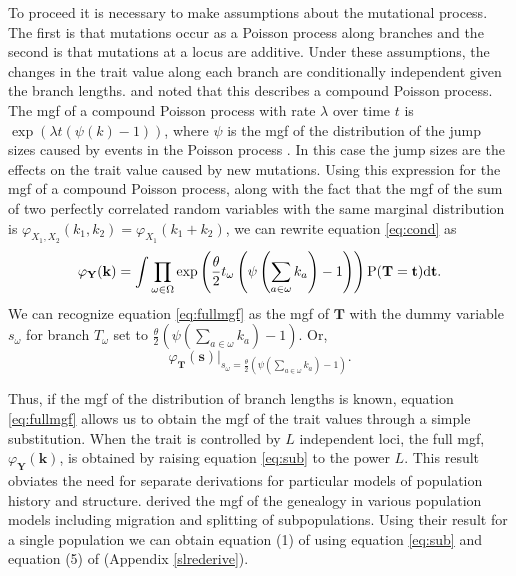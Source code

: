 To proceed it is necessary to make assumptions about the mutational process. The
first is that mutations occur as a Poisson process along branches and the second
is that mutations at a locus are additive. Under these assumptions, the changes
in the trait value along each branch are conditionally independent given the
branch lengths. \citet{Khaitovich2005} and \citet{Schraiber2015} noted that this
describes a compound Poisson process. The mgf of a compound Poisson process with
rate $\lambda$ over time $t$ is $\exp(\lambda t (\psi(k)-1))$, where $\psi$ is
the mgf of the distribution of the jump sizes caused by events in the Poisson
process \citep{kingman-poisson-processes}. In this case the jump sizes are the
effects on the trait value caused by new mutations. Using this expression for
the mgf of a compound Poisson process, along with the fact that the mgf of the
sum of two perfectly correlated random variables with the same marginal
distribution is $\varphi_{X_1,X_2}(k_1,k_2)=\varphi_{X_1}(k_1+k_2)$, we can
rewrite equation \eqref{eq:cond} as
\begin{equation}
  \label{eq:fullmgf}
  \varphi_{\mathbf{Y}}(\mathbf{k}) = 
  \int \prod_{\omega \in \Omega} \exp\left( \frac{\theta}{2} t_{\omega} \left( \psi\left(\sum_{a \in \omega}k_{a}\right) -1 \right)\right)
  \mathrm{P}(\mathbf{T}=\mathbf{t})\mbox{d}\mathbf{t}.
\end{equation}
We can recognize equation \eqref{eq:fullmgf} as the mgf of $\mathbf{T}$ with the
dummy variable $s_{\omega}$ for branch $T_\omega$ set to
$\frac{\theta}{2} \left( \psi(\sum_{a \in \omega}k_{a}) -1 \right)$. Or,
\begin{equation}
  \label{eq:sub}
  \varphi_{\mathbf{T}}(\mathbf{s})\Bigr|_{s_{\omega}=\frac{\theta}{2} \left( \psi\left(\sum_{a \in \omega}k_{a}\right) -1 \right)}.
\end{equation}

Thus, if the mgf of the distribution of branch lengths is known, equation
\eqref{eq:fullmgf} allows us to obtain the mgf of the trait values through a
simple substitution. When the trait is controlled by $L$ independent loci, the
full mgf, $\varphi_{\mathbf{Y}}(\mathbf{k})$, is obtained by raising
equation \eqref{eq:sub} to the power $L$. This result obviates the need for
separate derivations for particular models of population history and structure.
\citet{Lohse2011} derived the mgf of the genealogy in various population models
including migration and splitting of subpopulations. Using their result for a
single population we can obtain equation (1) of \citet{Schraiber2015} using
equation \eqref{eq:sub} and equation (5) of \citet{Lohse2011}
(Appendix \ref{slrederive}). 


